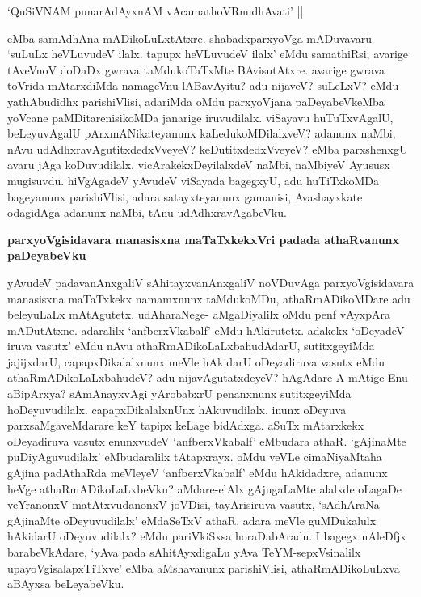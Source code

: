\begin{shloka}
`QuSiVNAM punarAdAyxnAM vAcamathoVRnudhAvati' ||\label{216a}
\end{shloka}

\noindent
eMba samAdhAna mADikoLuLxtAtxre. shabadxparxyoVga mADuvavaru `suLuLx heVLuvudeV ilalx. tapupx heVLuvudeV ilalx' eMdu samathiRsi, avarige tAveVnoV doDaDx gwrava taMdukoTaTxMte BAvisutAtxre. avarige gwrava toVrida mAtarxdiMda namageVnu lABavAyitu? adu nijaveV? suLeLxV? eMdu yathAbudidhx parishiVlisi, adariMda oMdu parxyoVjana paDeyabeVkeMba yoVcane paMDitarenisikoMDa janarige iruvudilalx. viSayavu huTuTxvAgalU, beLeyuvAgalU pArxmANikateyanunx kaLedukoMDilalxveV? adanunx naMbi, nAvu udAdhxravAgutitxdedxVveyeV? keDutitxdedxVveyeV? eMba parxshenxgU avaru jAga koDuvudilalx. vicArakekxDeyilalxdeV naMbi, naMbiyeV Ayususx mugisuvdu. hiVgAgadeV yAvudeV viSayada bagegxyU, adu huTiTxkoMDa bageyanunx parishiVlisi, adara satayxteyanunx gamanisi, Avashayxkate odagidAga adanunx naMbi, tAnu udAdhxravAgabeVku.

{\bigskip
\noindent
{\large\bf parxyoVgisidavara manasisxna maTaTxkekxVri padada athaRvanunx paDeyabeVku}}\label{page216a}
\medskip

\noindent
yAvudeV padavanAnxgaliV sAhitayxvanAnxgaliV noVDuvAga parxyoVgisidavara manasisxna maTaTxkekx namamxnunx taMdukoMDu, athaRmADikoMDare adu beleyuLaLx mAtAgutetx. udAharaNege- aMgaDiyalilx oMdu penf vAyxpAra mADutAtxne. adaralilx `anfberxVkabalf' eMdu hAkirutetx. adakekx `oDeyadeV iruva vasutx' eMdu nAvu athaRmADikoLaLxbahudAdarU, sutitxgeyiMda jajijxdarU, capapxDikalalxnunx meVle hAkidarU oDeyadiruva vasutx eMdu athaRmADikoLaLxbahudeV? adu nijavAgutatxdeyeV? hAgAdare A mAtige Enu aBipArxya? sAmAnayxvAgi yArobabxrU penanxnunx sutitxgeyiMda hoDeyuvudilalx. capapxDikalalxnUnx hAkuvudilalx. inunx oDeyuva parxsaMgaveMdarare keY tapipx keLage bidAdxga. aSuTx mAtarxkekx oDeyadiruva vasutx enunxvudeV `anfberxVkabalf' eMbudara athaR. `gAjinaMte puDiyAguvudilalx' eMbudaralilx tAtapxrayx. oMdu veVLe cimaNiyaMtaha gAjina padAthaRda meVleyeV `anfberxVkabalf' eMdu hAkidadxre, adanunx heVge athaRmADikoLaLxbeVku? aMdare-elAlx gAjugaLaMte alalxde oLagaDe veYranonxV matAtxvudanonxV joVDisi, tayArisiruva vasutx, `sAdhAraNa gAjinaMte oDeyuvudilalx' eMdaSeTxV athaR. adara meVle guMDukalulx hAkidarU oDeyuvudilalx? eMdu pariVkiSxsa horaDabAradu. I bagegx nAleDfjx barabeVkAdare, `yAva pada sAhitAyxdigaLu yAva TeYM-sepxVsinalilx upayoVgisalapxTiTxve' eMba aMshavanunx parishiVlisi, athaRmADikoLuLxva aBAyxsa beLeyabeVku.

